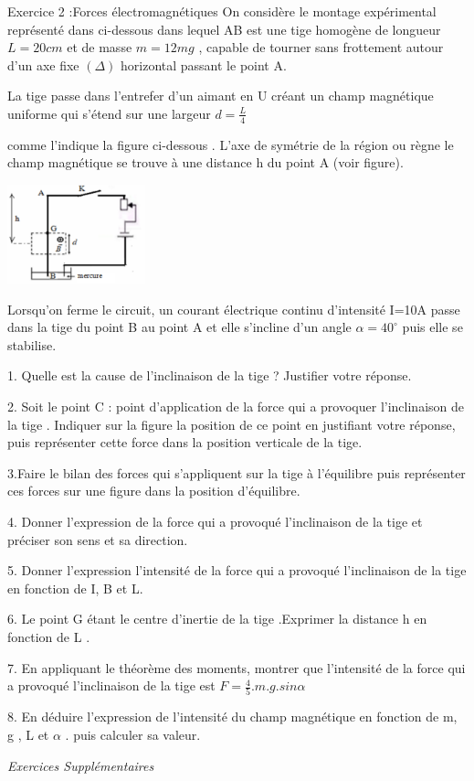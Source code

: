 \documentclass[12pt, french]{article}
\begin{document}
\begin{Box2}{Exercice 2 :Forces électromagnétiques }
On considère le montage expérimental représenté dans ci-dessous dans lequel AB est une tige homogène de longueur
$L=20cm$ et de masse $m=12mg$ , capable de tourner sans frottement autour d'un axe fixe $( \Delta)$ horizontal passant le point A.

   La tige passe dans l'entrefer d'un aimant en U créant un champ magnétique uniforme qui s'étend sur une largeur $d = \frac{L}{4}$

comme l'indique la figure ci-dessous .
L'axe de symétrie de la région ou règne le champ magnétique se trouve à une distance h du point A (voir figure).
  \begin{center}
     \vspace{-0.5cm}
    \includegraphics[width=0.3\textwidth]{./img/Screenshot from 2022-05-11 19-05-37.png}
  \end{center}


Lorsqu'on ferme le circuit, un courant électrique continu d'intensité I=10A passe dans la tige du point B au point A et elle s'incline d'un angle $\alpha = 40^{\circ}$
puis elle se stabilise.

1. Quelle est la cause de l'inclinaison de la tige ? Justifier votre réponse. 

2. Soit le point C : point d'application de la force qui a provoquer l'inclinaison de la tige . Indiquer sur la figure la position
de ce point en justifiant votre réponse, puis représenter cette force dans la position verticale de la tige.

3.Faire le bilan des forces qui s'appliquent sur la tige à l'équilibre puis représenter ces forces sur une figure dans la
position d'équilibre.

4. Donner l'expression de la force qui a provoqué l'inclinaison de la tige et préciser son sens et sa direction.

5. Donner l'expression l'intensité de la force qui a provoqué l'inclinaison de la tige en fonction de I, B et L.

6. Le point G étant le centre d'inertie de la tige .Exprimer la distance h en fonction de L .

   7. En appliquant le théorème des moments, montrer que l'intensité de la force qui a provoqué l'inclinaison de la tige est  $F = \frac{4}{5}.m.g.sin\alpha$ 

   8. En déduire l'expression de l'intensité du champ magnétique en fonction de m, g , L et $\alpha$ . puis calculer sa valeur.
\end{Box2}
\begin{center}
   \Large{ \em{Exercices Supplémentaires}}
\end{center}
\end{document}
